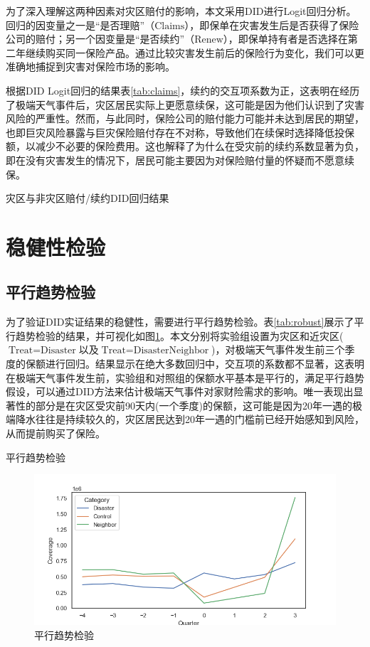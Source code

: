 为了深入理解这两种因素对灾区赔付的影响，本文采用DID进行Logit回归分析。回归的因变量之一是“是否理赔”（$\text{Claims}$），即保单在灾害发生后是否获得了保险公司的赔付；另一个因变量是“是否续约”（$\text{Renew}$），即保单持有者是否选择在第二年继续购买同一保险产品。通过比较灾害发生前后的保险行为变化，我们可以更准确地捕捉到灾害对保险市场的影响。

根据DID Logit回归的结果表\ref{tab:claims}，续约的交互项系数为正，这表明在经历了极端天气事件后，灾区居民实际上更愿意续保，这可能是因为他们认识到了灾害风险的严重性。然而，与此同时，保险公司的赔付能力可能并未达到居民的期望，也即巨灾风险暴露与巨灾保险赔付存在不对称\citep{张旭升2010中国巨灾风险暴露与巨灾保险赔付不对称实证}，导致他们在续保时选择降低投保额，以减少不必要的保险费用。这也解释了为什么在受灾前的续约系数显著为负，即在没有灾害发生的情况下，居民可能主要因为对保险赔付量的怀疑而不愿意续保。

\begin{table}[htbp]
    \centering
    \caption{灾区与非灾区赔付/续约DID回归结果}\label{tab:claims}
    
\end{table}

\section{稳健性检验}
\subsection{平行趋势检验}

为了验证DID实证结果的稳健性，需要进行平行趋势检验。表\ref{tab:robust}展示了平行趋势检验的结果，并可视化如图\ref{fig:robust}。本文分别将实验组设置为灾区和近灾区($\text{Treat}=\text{Disaster}$以及$\text{Treat}=\text{Disaster}\text{Neighbor}$)，对极端天气事件发生前三个季度的保额进行回归。结果显示在绝大多数回归中，交互项的系数都不显著，这表明在极端天气事件发生前，实验组和对照组的保额水平基本是平行的，满足平行趋势假设，可以通过DID方法来估计极端天气事件对家财险需求的影响。唯一表现出显著性的部分是在灾区受灾前90天内(一个季度)的保额，这可能是因为20年一遇的极端降水往往是持续较久的，灾区居民达到20年一遇的门槛前已经开始感知到风险，从而提前购买了保险。

\begin{table}[htbp]
    \centering
    \caption{平行趋势检验}\label{tab:robust}
    
\end{table}

\begin{figure}[htbp]
    \includegraphics[width=\linewidth]{lib/img/robust.png}
    \caption{平行趋势检验}\label{fig:robust}
\end{figure}

